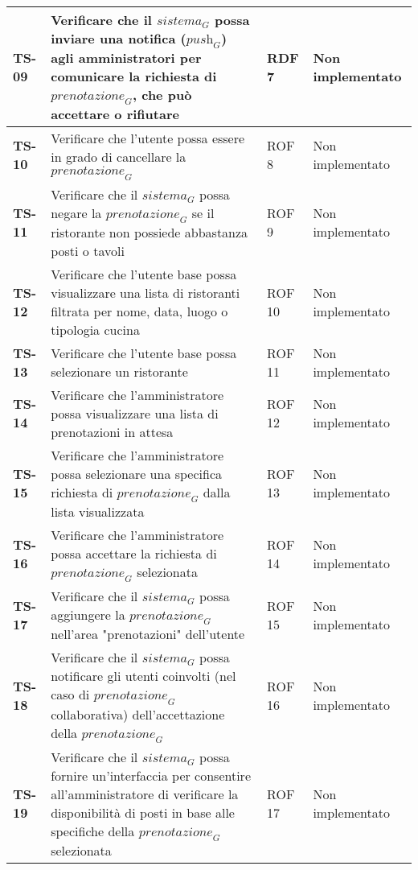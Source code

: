 \begin{longtable}{|>{\centering\arraybackslash}p{1.5cm}|p{9.8cm}|p{2cm}|p{3.5cm}|}
    \textbf{TS-09} & Verificare che il $\textit{sistema}_G$ possa inviare una notifica ($\textit{push}_G$) agli amministratori per comunicare la richiesta di $\textit{prenotazione}_G$, che può accettare o rifiutare & RDF 7 & Non implementato \\
    \hline
    \rowcolor{gray!10}
    \textbf{TS-10} & Verificare che l'utente possa essere in grado di cancellare la $\textit{prenotazione}_G$ & ROF 8 & Non implementato \\ 
    \hline
    \rowcolor{gray!10}
    \textbf{TS-11} & Verificare che il $\textit{sistema}_G$ possa negare la $\textit{prenotazione}_G$ se il ristorante non possiede abbastanza posti o tavoli & ROF 9 & Non implementato \\ 
    \hline
    \rowcolor{gray!10}
    \textbf{TS-12} & Verificare che l'utente base possa visualizzare una lista di ristoranti filtrata per nome, data, luogo o tipologia cucina & ROF 10 & Non implementato \\ 
    \hline
    \rowcolor{gray!10}
    \textbf{TS-13} & Verificare che l'utente base possa selezionare un ristorante & ROF 11 & Non implementato \\ 
    \hline
    \rowcolor{gray!10}
    \textbf{TS-14} & Verificare che l'amministratore possa visualizzare una lista di prenotazioni in attesa & ROF 12 & Non implementato \\
    \hline
    \rowcolor{gray!10}
    \textbf{TS-15} & Verificare che l'amministratore possa selezionare una specifica richiesta di $\textit{prenotazione}_G$ dalla lista visualizzata & ROF 13 & Non implementato \\ 
    \hline
    \rowcolor{gray!10}
    \textbf{TS-16} & Verificare che l'amministratore possa accettare la richiesta di $\textit{prenotazione}_G$ selezionata & ROF 14 & Non implementato \\ 
    \hline
    \rowcolor{gray!10}
    \textbf{TS-17} & Verificare che il $\textit{sistema}_G$ possa aggiungere la $\textit{prenotazione}_G$ nell'area "prenotazioni" dell'utente & ROF 15 & Non implementato \\
    \hline
    \rowcolor{gray!10}
    \textbf{TS-18} & Verificare che il $\textit{sistema}_G$ possa notificare gli utenti coinvolti (nel caso di $\textit{prenotazione}_G$ collaborativa) dell'accettazione della $\textit{prenotazione}_G$ & ROF 16 & Non implementato \\ 
    \hline
    \rowcolor{gray!10}
    \textbf{TS-19} & Verificare che il $\textit{sistema}_G$ possa fornire un'interfaccia per consentire all'amministratore di verificare la disponibilità di posti in base alle specifiche della $\textit{prenotazione}_G$ selezionata & ROF 17 & Non implementato \\ 

\end{longtable}
